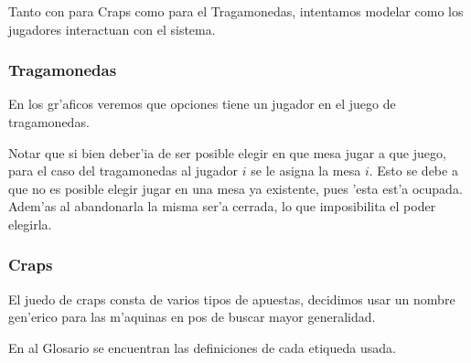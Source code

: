 
\newcommand{\ronda}{ \italica{ FSM Ronda} }
\newcommand{\crupier}{ \italica{ FSM Crupier} }
\newcommand{\tirador}{ \italica{ FSM tirador i} }
\newcommand{\unaRonda}{\italica{FSM Jugador i haciendo apuestas de \textbf{una ronda}}}
\newcommand{\muchasRondas}{\italica{FSM Jugador i haciendo apuestas en\textbf{ m'as de una ronda}}}
\newcommand{\unTiro}{\italica{FSM Jugador i haciendo apuestas de \textbf{un tiro}}}
Tanto con para Craps como para el Tragamonedas, intentamos modelar como los jugadores interactuan con el sistema.

\subsubsection{Tragamonedas}

En los gr'aficos veremos que opciones tiene un jugador en el juego de tragamonedas.

Notar que si bien deber'ia de ser posible elegir en que mesa jugar a que juego, para el caso del tragamonedas al jugador $i$ se le asigna la mesa $i$. Esto se debe a que no es posible elegir jugar en una mesa ya existente, pues 'esta est'a ocupada. Adem'as al abandonarla la misma ser'a cerrada, lo que imposibilita el poder elegirla.

\clearpage


\subsubsection{Craps}

El juedo de craps consta de varios tipos de apuestas, decidimos usar un nombre gen'erico para las m'aquinas en pos de buscar mayor generalidad.

En al Glosario se encuentran las definiciones de cada etiqueda usada.



